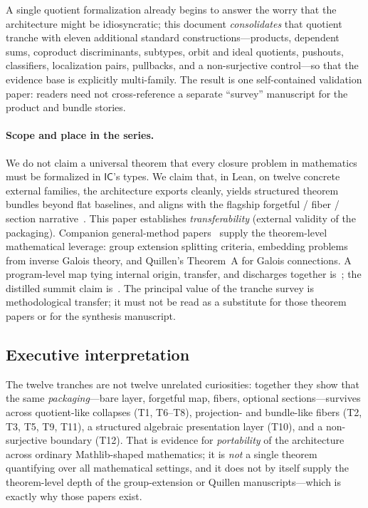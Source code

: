 \documentclass[11pt]{article}
\newcommand{\IC}{\ensuremath{\mathsf{IC}}}
\begin{document}
A single quotient formalization already begins to answer the worry that the architecture
might be idiosyncratic; this document \emph{consolidates} that quotient tranche with eleven
additional standard constructions---products, dependent sums, coproduct discriminants,
subtypes, orbit and ideal quotients, pushouts, classifiers, localization pairs, pullbacks,
and a non-surjective control---so that the
evidence base is explicitly multi-family. The result is one self-contained validation paper:
readers need not cross-reference a separate ``survey'' manuscript for the product and bundle
stories.

\paragraph{Scope and place in the series.}
We do not claim a universal theorem that every closure problem in mathematics must be
formalized in \IC{}'s types. We claim that, in Lean, on twelve concrete external families,
the architecture exports cleanly, yields structured theorem bundles beyond flat baselines,
and aligns with the flagship forgetful / fiber / section narrative~\cite{SpivackIC}.
This paper establishes \emph{transferability} (external validity of the packaging).
Companion general-method papers~\cite{SpivackFiber,SpivackQuillen} supply the
theorem-level mathematical leverage: group extension splitting criteria,
embedding problems from inverse Galois theory, and Quillen's Theorem~A for Galois
connections. A program-level map tying internal origin, transfer, and discharges
together is~\cite{SpivackSynthesis}; the distilled summit claim is~\cite{SpivackSummit}.
The principal value of the tranche survey is methodological transfer; it must not be
read as a substitute for those theorem papers or for the synthesis manuscript.

\subsection{Executive interpretation}\label{sec:exec}

The twelve tranches are not twelve unrelated curiosities: together they show that the same
\emph{packaging}---bare layer, forgetful map, fibers, optional sections---survives across
quotient-like collapses (T1, T6--T8), projection- and bundle-like fibers (T2, T3, T5, T9,
T11), a structured algebraic presentation layer (T10), and a non-surjective boundary (T12).
That is evidence for \emph{portability} of the architecture across ordinary Mathlib-shaped
mathematics; it is \emph{not} a single theorem quantifying over all mathematical settings,
and it does not by itself supply the theorem-level depth of the group-extension or Quillen
manuscripts---which is exactly why those papers exist.
\end{document}

